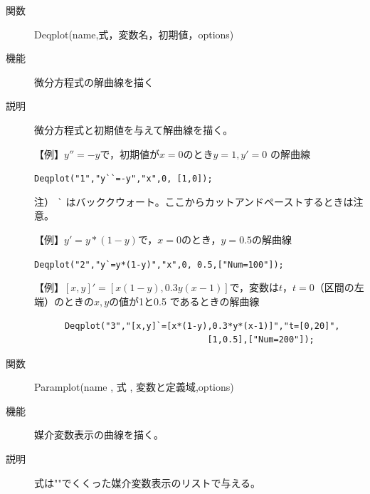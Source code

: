 \documentclass[papersize,a4paper,12pt,uplatex]{jsarticle}
\begin{document}
\begin{description}
\vspace{\baselineskip}
\hspace{20mm}

\vspace{\baselineskip}
\hypertarget{deqplot}{}
\item[関数]  Deqplot(name,式，変数名，初期値，options)
\item[機能]  微分方程式の解曲線を描く
\item[説明]  微分方程式と初期値を与えて解曲線を描く。

\vspace{\baselineskip}
【例】$y''=-y$で，初期値が$x=0$のとき$y=1,y'=0$ の解曲線

 \verb|Deqplot("1","y``=-y","x",0, [1,0]); |  
 
注） \verb|`| はバッククウォート。ここからカットアンドペーストするときは注意。

\vspace{\baselineskip}
\hspace{20mm}  

\vspace{\baselineskip}
【例】$y'=y*(1-y)$で，$x=0$のとき，$y=0.5$の解曲線

 \verb|Deqplot("2","y`=y*(1-y)","x",0, 0.5,["Num=100"]);| 
 
\vspace{\baselineskip}
\hspace{20mm}  

\vspace{\baselineskip}

【例】$[x,y]'=[x(1-y),0.3y(x-1)]$で，変数は$t$，$t=0$（区間の左端）のときの$x, y$の値が1と0.5 であるときの解曲線
\begin{verbatim}
      Deqplot("3","[x,y]`=[x*(1-y),0.3*y*(x-1)]","t=[0,20]",
                                  [1,0.5],["Num=200"]);
\end{verbatim} 

\vspace{\baselineskip}
\hspace{20mm}  

\vspace{\baselineskip}
\hypertarget{paramplot}{}
\item[関数]  Paramplot(name , 式 , 変数と定義域,options)
\item[機能]  媒介変数表示の曲線を描く。
\item[説明]  式は""でくくった媒介変数表示のリストで与える。


\end{description}
\end{document}
